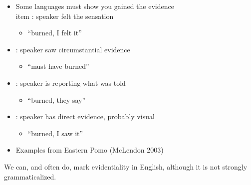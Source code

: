 \documentclass[a4paper,landscape,headrule,footrule,xetex]{foils}
\begin{document}
\begin{itemize}
\item  Some languages must show you gained the evidence
\\item  {}:  speaker felt the sensation
  \begin{itemize}
  \item {} ``burned, I felt it''
  \end{itemize}
\item  {}: speaker saw circumstantial evidence 
  \begin{itemize}
  \item  {}  ``must have burned''
  \end{itemize}
\item  {}:   speaker is reporting what was told
  \begin{itemize}
  \item  {} ``burned, they say''
  \end{itemize}
\item  {}:   speaker has direct evidence, probably visual 
  \begin{itemize}
  \item {} ``burned, I saw it''
  \end{itemize}
\item Examples from Eastern Pomo (McLendon 2003)
\end{itemize}


We can, and often do, mark evidentiality in English, although it is
not strongly grammaticalized.

\begin{exe}
\ex {}
\ex {}
\ex {}
\ex {}
\ex {}
\ex {}
\ex {}
\end{exe}
\end{document}
